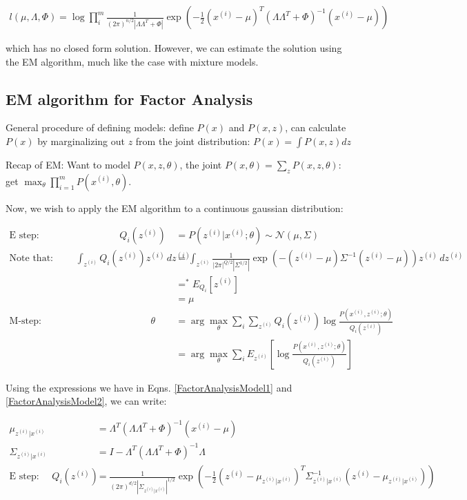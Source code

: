 \documentclass[letterpaper,10pt]{article}
\begin{document}
\begin{align}
l(\mu, \Lambda, \Phi) = \log \prod_{i}^m \frac{1}{(2\pi)^{n/2} |\Lambda \Lambda^T + \Phi|}\exp\left( - \frac{1}{2} (x^{(i)}-\mu)^T (\Lambda \Lambda^T + \Phi)^{-1} (x^{(i)}-\mu) \right)
\end{align}

which has no closed form solution. However, we can estimate the solution using the EM algorithm, much like the case with mixture models. 

\subsection{EM algorithm for Factor Analysis}

General procedure of defining models: define $P(x)$ and $P(x,z)$, can calculate $P(x)$ by marginalizing out $z$ from the joint distribution: $P(x) = \int P(x,z) dz$

Recap of EM: Want to model $P(x,z,\theta)$, the joint $P(x,\theta) = \sum_z P(x,z,\theta)$: get $\max_\theta \prod_{i=1}^m P(x^{(i)},\theta)$.

Now, we wish to apply the EM algorithm to a continuous gaussian distribution:

\begin{align}
\text{E step: } \qquad \qquad \qquad \qquad Q_i (z^{(i)}) &= P(z^{(i)}|x^{(i)}; \theta) \sim \mathscr{N}(\mu, \Sigma) \\
\text{Note that: } \qquad \int_{z^{(i)}} Q_i(z^{(i)})z^{(i)} \, dz^{(i)} &= \int_{z^{(i)}} \frac{1}{|2\pi|^{Q/2} |\Sigma^{1/2}|} \exp(-(z^{(i)} - \mu)\Sigma^{-1}(z^{(i)}-\mu)) z^{(i)} \, dz^{(i)} \\
&=^* E_{Q_i}[z^{(i)}] \\
&= \mu \\
\text{M-step: } \qquad \qquad \qquad \qquad \qquad \quad
 \theta &= \arg \max_\theta \sum_i \sum_{z^{(i)}} Q_i(z^{(i)}) \log \frac{P(x^{(i)},z^{(i)};\theta)}{Q_i(z^{(i)})} \\
&= \arg \max_\theta \sum_i E_{z^{(i)}} \left[ \log \frac{P(x^{(i)},z^{(i)};\theta)}{Q_i(z^{(i)})} \right]
\end{align}


Using the expressions we have in Eqns. \ref{FactorAnalysisModel1} and \ref{FactorAnalysisModel2}, we can write:

\begin{align}
\mu_{z^{(i)}|x^{(i)}} &= \Lambda^T (\Lambda \Lambda^T + \Phi)^{-1} (x^{(i)} - \mu) \\
\Sigma_{z^{(i)}|x^{(i)}} &= I - \Lambda^T (\Lambda \Lambda^T + \Phi)^{-1} \Lambda \\
\text{E step: } \quad Q_i (z^{(i)}) &=\frac{1}{(2\pi)^{d/2} |\Sigma_{z^{(i)}|x^{(i)}}|^{1/2}}\exp\left( - \frac{1}{2} (z^{(i)}-\mu_{z^{(i)}|x^{(i)}} )^T \Sigma_{z^{(i)}|x^{(i)}}^{-1} (z^{(i)}-\mu_{z^{(i)}|x^{(i)}} ) \right)
\end{align}
\end{document}
